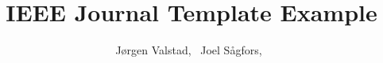 \documentclass[journal]{IEEEtran}
\begin{document}
\title{IEEE Journal Template Example}

\author{Jørgen Valstad,~
        Joel Sågfors,~}%

\maketitle




\appendices






\end{document}
